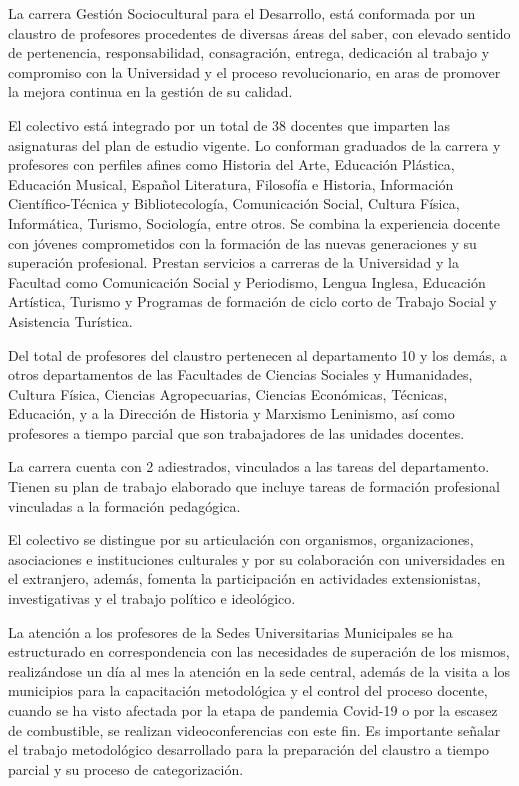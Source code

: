 La carrera Gestión Sociocultural para el Desarrollo, está conformada por un claustro de profesores procedentes de diversas áreas del saber, con elevado sentido de pertenencia, responsabilidad, consagración, entrega, dedicación al trabajo y compromiso con la Universidad y el proceso revolucionario, en aras de promover la mejora continua en la gestión de su calidad. 

El colectivo está integrado por un total de 38 docentes que imparten las asignaturas del plan de estudio vigente. Lo conforman graduados de la carrera y profesores con perfiles afines como Historia del Arte, Educación Plástica, Educación Musical, Español Literatura, Filosofía e Historia, Información Científico-Técnica y Bibliotecología, Comunicación Social, Cultura Física, Informática, Turismo, Sociología, entre otros. Se combina la experiencia docente con jóvenes comprometidos con la formación de las nuevas generaciones y su superación profesional. Prestan servicios a carreras de la Universidad y la Facultad como Comunicación Social y Periodismo, Lengua Inglesa, Educación Artística, Turismo y Programas de formación de ciclo corto de Trabajo Social y Asistencia Turística. 

Del total de profesores del claustro pertenecen al departamento 10 y los demás, a otros departamentos de las Facultades de Ciencias Sociales y Humanidades, Cultura Física, Ciencias Agropecuarias, Ciencias Económicas, Técnicas, Educación, y a la Dirección de Historia y Marxismo Leninismo, así como profesores a tiempo parcial que son trabajadores de las unidades docentes. 

La carrera cuenta con 2 adiestrados, vinculados a las tareas del departamento. Tienen su plan de trabajo elaborado que incluye tareas de formación profesional vinculadas a la formación pedagógica.  

El colectivo se distingue por su articulación con organismos, organizaciones, asociaciones e instituciones culturales y por su colaboración con universidades en el extranjero, además, fomenta la participación en actividades extensionistas, investigativas y el trabajo político e ideológico. 

La atención a los profesores de la Sedes Universitarias Municipales se ha estructurado en correspondencia con las necesidades de superación de los mismos, realizándose un día al mes la atención en la sede central, además de la visita a los municipios para la capacitación metodológica y el control del proceso docente, cuando se ha visto afectada por la etapa de pandemia Covid-19 o por la escasez de combustible, se realizan videoconferencias con este fin. Es importante señalar el trabajo metodológico desarrollado para la preparación del claustro a tiempo parcial y su proceso de categorización.

